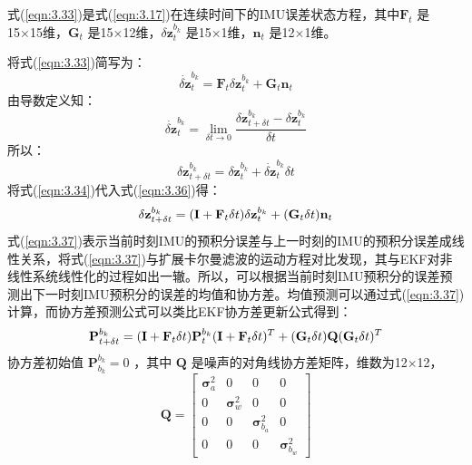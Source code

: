 式(\ref{eqn:3.33})是式(\ref{eqn:3.17})在连续时间下的IMU误差状态方程，其中$ \mathbf{F}_t $ 是15×15维，$ \mathbf{G}_t $ 是15×12维，$ \delta \mathbf{z}_t^{b_k}$ 是15×1维，$\mathbf{n}_t $ 是12×1维。

将式(\ref{eqn:3.33})简写为：
\begin{equation}
\label{eqn:3.34}
\dot{\delta \mathbf{z}}_t^{b_k} = \mathbf{F}_t \delta \mathbf{z}_t^{b_k} + \mathbf{G}_t\mathbf{n}_t
\end{equation}
由导数定义知：
\begin{equation}
\label{eqn:3.35}
\dot{\delta \mathbf{z}}_t^{b_k} = \lim _{\delta t \rightarrow 0} \frac{\delta \mathbf{z}_{t+\delta t}^{b_k} - \delta \mathbf{z}_t^{b_k}}{\delta t}
\end{equation}
所以：
\begin{equation}
\label{eqn:3.36}
\delta \mathbf{z}_{t+\delta t}^{b_k} = \delta \mathbf{z}_t^{b_k} + \dot{\delta \mathbf{z}}_t^{b_k} \delta t
\end{equation}
将式(\ref{eqn:3.34})代入式(\ref{eqn:3.36})得：
\begin{equation}
\label{eqn:3.37}
\setlength{\abovedisplayskip}{6pt}
\setlength{\belowdisplayskip}{6pt}
\delta \mathbf{z}_{t+\delta t}^{b_k} = ( \mathbf{I}+ \mathbf{F}_t \delta t )\delta \mathbf{z}_t^{b_k} + ( \mathbf{G}_t \delta t )\mathbf{n}_t
\end{equation}
式(\ref{eqn:3.37})表示当前时刻IMU的预积分误差与上一时刻的IMU的预积分误差成线性关系，将式(\ref{eqn:3.37})与扩展卡尔曼滤波的运动方程对比发现，其与EKF对非线性系统线性化的过程如出一辙。所以，可以根据当前时刻IMU预积分的误差预测出下一时刻IMU预积分的误差的均值和协方差。均值预测可以通过式(\ref{eqn:3.37})计算，而协方差预测公式可以类比EKF协方差更新公式得到：
\begin{equation}
\label{eqn:3.38}
\setlength{\abovedisplayskip}{6pt}
\setlength{\belowdisplayskip}{6pt}
\mathbf{P}_{t+\delta t}^{b_k}=(\mathbf{I}+\mathbf{F}_t\delta t)\mathbf{P}_t^{b_k}(\mathbf{I}+\mathbf{F}_t\delta t)^T+(\mathbf{G}_t\delta t)\mathbf{Q}(\mathbf{G}_t\delta t)^T
\end{equation}
协方差初始值 $\mathbf{P}_{b_k}^{b_k}=0 $ ，其中 $\mathbf{Q} $ 是噪声的对角线协方差矩阵，维数为12×12，
\begin{equation}
\label{eqn:3.39}
\mathbf{Q} =\left[ \begin{array}{cccc}
{\bm{\sigma}_{a}^{2}} & {0} & {0} & {0} \\ 
{0} & {\bm{\sigma}_{w}^{2}} & {0} & {0} \\ 
{0} & {0} & {\bm{\sigma}_{b_{a}}^{2}} & {0} \\ 
{0} & {0} & {0} & {\bm{\sigma}_{b_{w}}^{2}
}\end{array}\right]
\end{equation}


